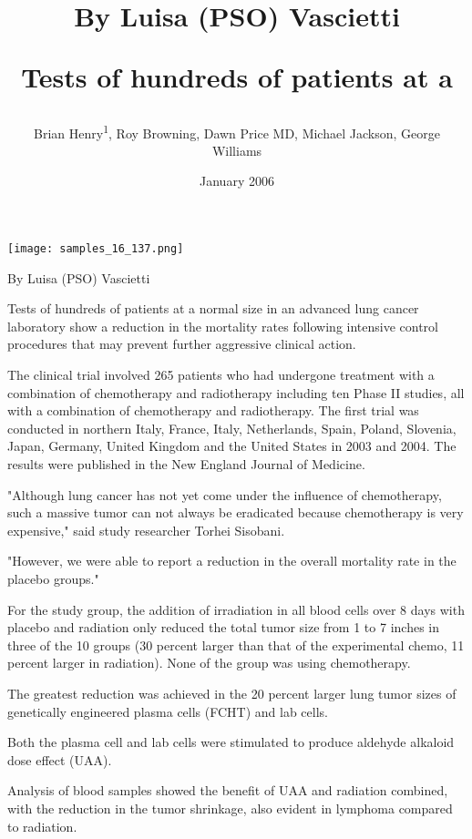 \documentclass{article}
\title{By Luisa (PSO) Vascietti

Tests of hundreds of patients at a}
\author{Brian Henry\textsuperscript{1},  Roy Browning,  Dawn Price MD,  Michael Jackson,  George Williams}
\affil{\textsuperscript{1}University of Arizona}
\date{January 2006}
\begin{document}
\maketitle

\begin{center}
\begin{minipage}{0.75\linewidth}
\texttt{[image: samples\_16\_137.png]}
\end{minipage}
\end{center}

By Luisa (PSO) Vascietti

Tests of hundreds of patients at a normal size in an advanced lung cancer laboratory show a reduction in the mortality rates following intensive control procedures that may prevent further aggressive clinical action.

The clinical trial involved 265 patients who had undergone treatment with a combination of chemotherapy and radiotherapy including ten Phase II studies, all with a combination of chemotherapy and radiotherapy. The first trial was conducted in northern Italy, France, Italy, Netherlands, Spain, Poland, Slovenia, Japan, Germany, United Kingdom and the United States in 2003 and 2004. The results were published in the New England Journal of Medicine.

"Although lung cancer has not yet come under the influence of chemotherapy, such a massive tumor can not always be eradicated because chemotherapy is very expensive," said study researcher Torhei Sisobani.

"However, we were able to report a reduction in the overall mortality rate in the placebo groups."

For the study group, the addition of irradiation in all blood cells over 8 days with placebo and radiation only reduced the total tumor size from 1 to 7 inches in three of the 10 groups (30 percent larger than that of the experimental chemo, 11 percent larger in radiation). None of the group was using chemotherapy.

The greatest reduction was achieved in the 20 percent larger lung tumor sizes of genetically engineered plasma cells (FCHT) and lab cells.

Both the plasma cell and lab cells were stimulated to produce aldehyde alkaloid dose effect (UAA).

Analysis of blood samples showed the benefit of UAA and radiation combined, with the reduction in the tumor shrinkage, also evident in lymphoma compared to radiation.
\end{document}
